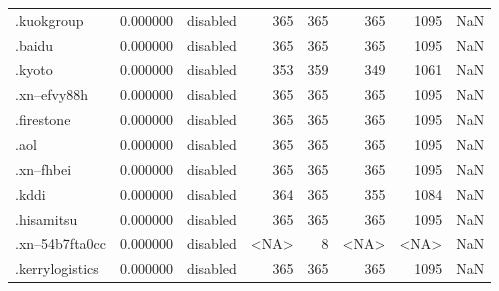 \begin{tabular}{lrlrrrrl}
.kuokgroup                &          0.000000 &        disabled &                         365 &                         365 &                         365 &                1095 &                  NaN \\
.baidu                    &          0.000000 &        disabled &                         365 &                         365 &                         365 &                1095 &                  NaN \\
.kyoto                    &          0.000000 &        disabled &                         353 &                         359 &                         349 &                1061 &                  NaN \\
.xn--efvy88h              &          0.000000 &        disabled &                         365 &                         365 &                         365 &                1095 &                  NaN \\
.firestone                &          0.000000 &        disabled &                         365 &                         365 &                         365 &                1095 &                  NaN \\
.aol                      &          0.000000 &        disabled &                         365 &                         365 &                         365 &                1095 &                  NaN \\
.xn--fhbei                &          0.000000 &        disabled &                         365 &                         365 &                         365 &                1095 &                  NaN \\
.kddi                     &          0.000000 &        disabled &                         364 &                         365 &                         355 &                1084 &                  NaN \\
.hisamitsu                &          0.000000 &        disabled &                         365 &                         365 &                         365 &                1095 &                  NaN \\
.xn--54b7fta0cc           &          0.000000 &        disabled &                        <NA> &                           8 &                        <NA> &                <NA> &                  NaN \\
.kerrylogistics           &          0.000000 &        disabled &                         365 &                         365 &                         365 &                1095 &                  NaN \\

\end{tabular}

